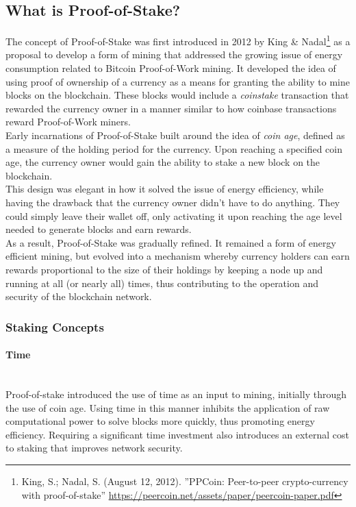 \documentclass[11pt]{article}
\begin{document}
\subsection{What is Proof-of-Stake?}
The concept of Proof-of-Stake was first introduced in 2012 by King \& Nadal\footnote{King, S.; Nadal, S. (August 12, 2012). ”PPCoin: Peer-to-peer crypto-currency  with  proof-of-stake” \url{https://peercoin.net/assets/paper/peercoin-paper.pdf}} as a proposal to develop a form of mining that addressed the growing issue of energy consumption related to Bitcoin Proof-of-Work mining. It developed the idea of using proof of ownership of a currency as a means for granting the ability to mine blocks on the blockchain. These blocks would include a \textit{coinstake} transaction that rewarded the currency owner in a manner similar to how coinbase transactions reward Proof-of-Work miners.\\

\noindent Early incarnations of Proof-of-Stake built around the idea of \textit{coin age}, defined as a measure of the holding period for the currency. Upon reaching a specified coin age, the currency owner would gain the ability to stake a new block on the blockchain.\\

\noindent This design was elegant in how it solved the issue of energy efficiency, while having the drawback that the currency owner didn't have to do anything. They could simply leave their wallet off, only activating it upon reaching the age level needed to generate blocks and earn rewards.\\

\noindent As a result, Proof-of-Stake was gradually refined. It remained a form of energy efficient mining, but evolved into a mechanism whereby currency holders can earn rewards proportional to the size of their holdings by keeping a node up and running at all (or nearly all) times, thus contributing to the operation and security of the blockchain network.\\

\subsubsection{Staking Concepts}

\paragraph{Time} ~\\
Proof-of-stake introduced the use of time as an input to mining, initially through the use of coin age. Using time in this manner inhibits the application of raw computational power to solve blocks more quickly, thus promoting energy efficiency. Requiring a significant time investment also introduces an external cost to staking that improves network security. 
\end{document}
